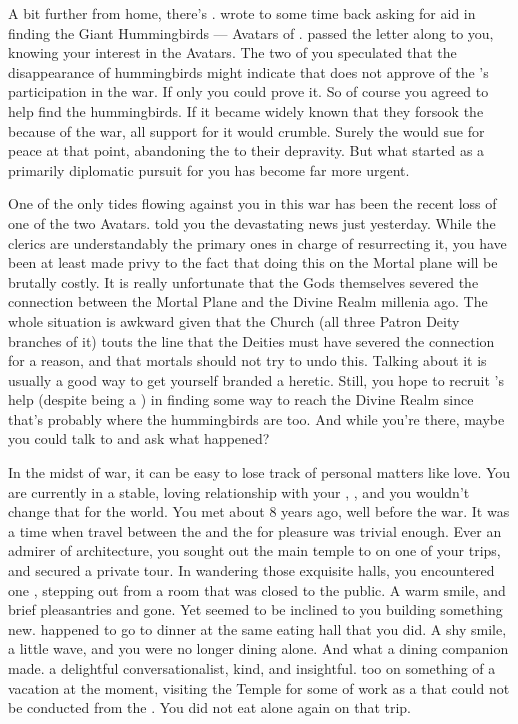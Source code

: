 \documentclass[char]{GL2020}
\begin{document}
A bit further from home, there's \cDisney{\full}. \cDisney{\They} wrote to \cHeadDiplomat{} some time back asking for aid in finding the Giant Hummingbirds — Avatars of \cFarmGod{}. \cHeadDiplomat{} passed the letter along to you, knowing your interest in the Avatars. The two of you speculated that the disappearance of hummingbirds might indicate that \cFarmGod{} does not approve of the \pFarm{}’s participation in the war. If only you could prove it. So of course you agreed to help \cDisney{} find the hummingbirds. If it became widely known that they forsook the \pFarm{} because of the war, all support for it would crumble. Surely the \pFarm{} would sue for peace at that point, abandoning the \pTech{} to their depravity. But what started as a primarily diplomatic pursuit for you has become far more urgent.

One of the only tides flowing against you in this war has been the recent loss of one of the two \pShip{} Avatars. \cEbbPriest{} told you the devastating news just yesterday. While the clerics are understandably the primary ones in charge of resurrecting it, you have been at least made privy to the fact that doing this on the Mortal plane will be brutally costly. It is really unfortunate that the Gods themselves severed the connection between the Mortal Plane and the Divine Realm millenia ago. The whole situation is awkward given that the Church (all three Patron Deity branches of it) touts the line that the Deities must have severed the connection for a reason, and that mortals should not try to undo this. Talking about it is usually a good way to get yourself branded a heretic. Still, you hope to recruit \cDisney{}’s help (despite \cDisney{\them} being a \cDisney{\cleric}) in finding some way to reach the Divine Realm since that’s probably where the hummingbirds are too. And while you’re there, maybe you could talk to \cFarmGod{} and ask what happened?

In the midst of war, it can be easy to lose track of personal matters like love. You are currently in a stable, loving relationship with your \cBeetle{\partner}, \cBeetle{\full}, and you wouldn't change that for the world. You met about 8 years ago, well before the war. It was a time when travel between the \pTech{} and the \pShip{} for pleasure was trivial enough. Ever an admirer of architecture, you sought out the main temple to \cTechGod{} on one of your trips, and secured a private tour. In wandering those exquisite halls, you encountered one \cBeetle{}, stepping out from a room that was closed to the public. A warm smile, and brief pleasantries and \cBeetle{\theywere} gone. Yet \cFlow{} seemed to be inclined to you building something new. \cBeetle{} happened to go to dinner at the same eating hall that you did. A shy smile, a little wave, and you were no longer dining alone. And what a dining companion \cBeetle{} made. \cBeetle{\Theyare} a delightful conversationalist, kind, and insightful. \cBeetle{\They} too \cBeetle{\were} on something of a vacation at the moment, visiting the Temple for some of \cBeetle{\their} work as a \cBeetle{\cleric} that could not be conducted from the \pSchool{}. You did not eat alone again on that trip.
\end{document}
